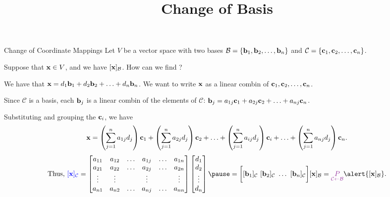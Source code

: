 \documentclass[xcolor=dvipsnames,aspectratio=169,t]{beamer}
\title{Change of Basis}
\renewcommand{\C}{\mathcal{C}}
\begin{document}
\maketitle

\begin{frame}{Change of Coordinate Mappings}
  Let $V$ be a vector space with two bases 
  $\mathcal{B} = \left\{ \mathbf{b}_1, \mathbf{b}_2, \ldots, \mathbf{b}_n \right\}$ and
  $\C = \left\{ \c_1, \c_2, \ldots, \c_n \right\}$.
  
  Suppose that $\mathbf{x}\in V$, and we have \alert{$[\mathbf{x}]_{\mathcal{B}}$}.  How can we find \blue{$[\x]_\C$}?
  \bigskip
  
  \pause
  {\small
  We have that $\mathbf{x} = d_1 \mathbf{b}_1 + d_2 \mathbf{b}_2 + \ldots + d_n \mathbf{b}_n$.
  We want to write $\mathbf{x}$ as a linear combin of $\mathbf{c}_1, \mathbf{c}_2, \ldots, \mathbf{c}_n$.
  \smallskip

  Since $\C$ is a basis,
  each $\mathbf{b}_j$ is a linear combin of the elements of $\C$:
  $\mathbf{b}_j= a_{1j} \mathbf{c}_1 + a_{2j} \mathbf{c}_2 + \ldots + a_{nj} \mathbf{c}_n$.
  \smallskip
  
  Substituting and grouping the $\mathbf{c}_i$, we have
  \[
    \mathbf{x} = 
     \left( \sum_{j=1}^n a_{1j} d_j \right) \mathbf{c}_1
    +\left( \sum_{j=1}^n a_{2j} d_j \right) \mathbf{c}_2
    +\ldots
    +\left( \sum_{j=1}^n a_{ij} d_j \right) \mathbf{c}_i
    +\ldots
    +\left( \sum_{j=1}^n a_{nj} d_j \right) \mathbf{c}_n.
  \]
  \pause
  \[
  \text{Thus, }
  \blue{[\x]_\C} =
  \begin{bmatrix} a_{11} & a_{12} & \ldots & a_{1j} & \ldots & a_{1n} \\
  a_{21} & a_{22} & \ldots & a_{2j} & \ldots & a_{2n} \\
  \vdots & \vdots &  & \vdots & & \vdots \\
  a_{n1} & a_{n2} & \ldots & a_{nj} & \ldots & a_{nn} \end{bmatrix}
  \begin{bmatrix} d_1 \\ d_2 \\ \vdots \\ d_n \end{bmatrix}
  \pause
  = 
  \bigg[ [\b_1]_\C \ [\b_2]_\C \ \ldots \ [\b_n]_\C \bigg] [\x]_\B
  = \purple{\underset{\C \leftarrow \B}{P}} \alert{[\x]_\B}.
  \]
  }
\end{frame}
\end{document}
